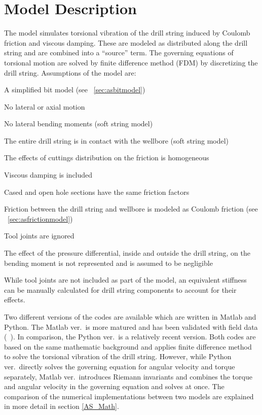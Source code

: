 \section{Model Description}
The model simulates torsional vibration of the drill string induced by Coulomb friction and viscous damping.  These are modeled as distributed along the drill string and are combined into a ``source'' term. The governing equations of torsional motion are solved by finite difference method (FDM) by discretizing the drill string. Assumptions of the model are:
\begin{bulletedlist}
	\item A simplified bit model (see \sectionname~\ref{sec:asbitmodel})
	\item No lateral or axial motion
    \item No lateral bending moments (soft string model)
    \item The entire drill string is in contact with the wellbore (soft string model)
	\item The effects of cuttings distribution on the friction is homogeneous
	\item Viscous damping is included
	\item Cased and open hole sections have the same friction factors
    \item Friction between the drill string and wellbore is modeled as Coulomb friction (see \sectionname~\ref{sec:asfrictionmodel})
    \item Tool joints are ignored
    \item The effect of the pressure differential, inside and outside the drill string, on the bending moment is not represented and is assumed to be negligible
\end{bulletedlist}
While tool joints are not included as part of the model, an equivalent stiffness can be manually calculated for drill string components to account for their effects.

Two different versions of the codes are available which are written in Matlab and Python. The Matlab ver.\ is more matured and has been validated with field data (~\cite{ref:aarsnes2017a}). In comparison, the Python ver.\ is a relatively recent version. Both codes are based on the same mathematic background and applies finite difference method to solve the torsional vibration of the drill string. However, while Python ver.\ directly solves the governing equation for angular velocity and torque separately, Matlab ver.\ introduces Riemann invariants and combines the torque and angular velocity in the governing equation and solves at once. The comparison of the numerical implementations between two models are explained in more detail in section \ref{AS_Math}.

